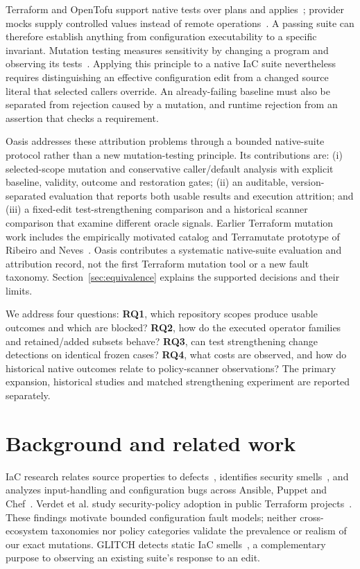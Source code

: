 Terraform and OpenTofu support native tests over plans and applies~\cite{terraformtests,tofutests}; provider mocks supply controlled values instead of remote operations~\cite{mocks}. A passing suite can therefore establish anything from configuration executability to a specific invariant. Mutation testing measures sensitivity by changing a program and observing its tests~\cite{jia,papadakis}. Applying this principle to a native IaC suite nevertheless requires distinguishing an effective configuration edit from a changed source literal that selected callers override. An already-failing baseline must also be separated from rejection caused by a mutation, and runtime rejection from an assertion that checks a requirement.

Oasis addresses these attribution problems through a bounded native-suite protocol rather than a new mutation-testing principle. Its contributions are: (i) selected-scope mutation and conservative caller/default analysis with explicit baseline, validity, outcome and restoration gates; (ii) an auditable, version-separated evaluation that reports both usable results and execution attrition; and (iii) a fixed-edit test-strengthening comparison and a historical scanner comparison that examine different oracle signals. Earlier Terraform mutation work includes the empirically motivated catalog and Terramutate prototype of Ribeiro and Neves~\cite{ribeiro}. Oasis contributes a systematic native-suite evaluation and attribution record, not the first Terraform mutation tool or a new fault taxonomy. Section~\ref{sec:equivalence} explains the supported decisions and their limits.

We address four questions: \textbf{RQ1}, which repository scopes produce usable outcomes and which are blocked? \textbf{RQ2}, how do the executed operator families and retained/added subsets behave? \textbf{RQ3}, can test strengthening change detections on identical frozen cases? \textbf{RQ4}, what costs are observed, and how do historical native outcomes relate to policy-scanner observations? The primary expansion, historical studies and matched strengthening experiment are reported separately.

\section{Background and related work}\label{sec:related}
IaC research relates source properties to defects~\cite{rahman}, identifies security smells~\cite{seven}, and analyzes input-handling and configuration bugs across Ansible, Puppet and Chef~\cite{drosos}. Verdet et al. study security-policy adoption in public Terraform projects~\cite{verdet}. These findings motivate bounded configuration fault models; neither cross-ecosystem taxonomies nor policy categories validate the prevalence or realism of our exact mutations. GLITCH detects static IaC smells~\cite{glitch,glitchdemo}, a complementary purpose to observing an existing suite's response to an edit.

